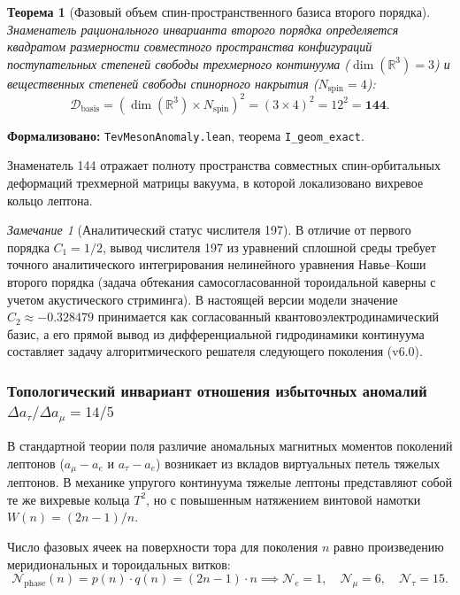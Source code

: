 \documentclass[11pt,a4paper]{article}
\newtheorem{theorem}{Теорема}
\theoremstyle{definition}
\theoremstyle{remark}
\newtheorem{remark}{Замечание}
\begin{document}
\begin{theorem}[Фазовый объем спин-пространственного базиса второго порядка]
\label{thm:geometric_denominator_144}
    Знаменатель рационального инварианта второго порядка определяется квадратом размерности совместного пространства конфигураций поступательных степеней свободы трехмерного континуума ($\dim(\mathbb{R}^3) = 3$) и вещественных степеней свободы спинорного накрытия ($N_{\mathrm{spin}} = 4$):
\begin{equation}
    \mathcal{D}_{\mathrm{basis}} = \left( \dim(\mathbb{R}^3) \times N_{\mathrm{spin}} \right)^2 = (3 \times 4)^2 = 12^2 = \mathbf{144}.
    \label{eq:denominator_144_origin}
\end{equation}
\end{theorem}

\noindent\small\textbf{Формализовано:} \texttt{TevMesonAnomaly.lean}, теорема \texttt{I_geom_exact}.

Знаменатель 144 отражает полноту пространства совместных спин-орбитальных деформаций трехмерной матрицы вакуума, в которой локализовано вихревое кольцо лептона.

\begin{remark}[Аналитический статус числителя 197]
    В отличие от первого порядка $C_1 = 1/2$, вывод числителя 197 из уравнений сплошной среды требует точного аналитического интегрирования нелинейного уравнения Навье--Коши второго порядка (задача обтекания самосогласованной тороидальной каверны с учетом акустического стриминга). В настоящей версии модели значение $C_2 \approx -0.328479$ принимается как согласованный квантовоэлектродинамический базис, а его прямой вывод из дифференциальной гидродинамики континуума составляет задачу алгоритмического решателя следующего поколения (v6.0).
\end{remark}

\subsubsection{Топологический инвариант отношения избыточных аномалий $\Delta a_\tau / \Delta a_\mu = 14/5$}

В стандартной теории поля различие аномальных магнитных моментов поколений лептонов ($a_\mu - a_e$ и $a_\tau - a_e$) возникает из вкладов виртуальных петель тяжелых лептонов. В механике упругого континуума тяжелые лептоны представляют собой те же вихревые кольца $T^2$, но с повышенным натяжением винтовой намотки $W(n) = (2n-1)/n$.

Число фазовых ячеек на поверхности тора для поколения $n$ равно произведению меридиональных и тороидальных витков:
\begin{equation}
    \mathcal{N}_{\mathrm{phase}}(n) = p(n) \cdot q(n) = (2n - 1) \cdot n \implies \mathcal{N}_e = 1, \quad \mathcal{N}_\mu = 6, \quad \mathcal{N}_\tau = 15.
    \label{eq:lepton_phase_volume_cells}
\end{equation}
\end{document}

